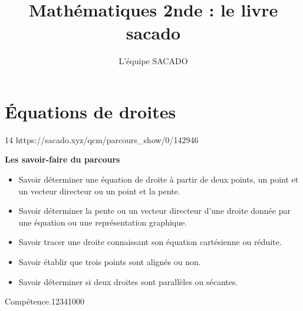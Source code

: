 



\title{Mathématiques 2nde  : le livre sacado}
\author{L'équipe SACADO}




\chapter{Équations de droites}{14}
{https://sacado.xyz/qcm/parcours_show/0/142946}
{
 \begin{CpsCol}
	\textbf{Les savoir-faire du parcours}
 	\begin{itemize}
 		\item Savoir déterminer une équation de droite à partir de deux points, un point et un vecteur directeur ou un point et la pente.
		\item Savoir déterminer la pente ou un vecteur directeur d'une droite donnée par une équation ou
une représentation graphique.
		\item Savoir tracer une droite connaissant son équation cartésienne ou réduite.
		\item Savoir établir que trois points sont alignés ou non.
		\item Savoir déterminer si deux droites sont parallèles ou sécantes.
 	\end{itemize}
 \end{CpsCol}

\begin{His}
\end{His}

\begin{ExoDec}{Compétence.}{1234}{1}{0}{0}{0}
\end{ExoDec}
}


